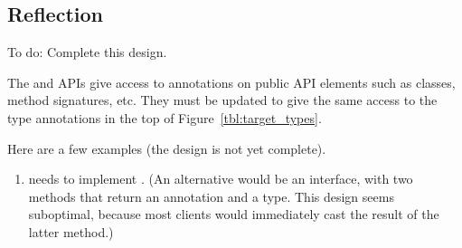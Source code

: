 \documentclass[10pt]{article}
\begin{document}
\subsection{Reflection\label{reflection}}

To do:  Complete this design.

The  and  APIs give access
to annotations on public API elements such as classes,
method signatures, etc.  They must be updated to give the same
access to the type annotations in the top of
Figure~\ref{tbl:target_types}.

Here are a few examples (the design is not yet complete).

\begin{enumerate}
\item
{} needs to implement
.
(An alternative would be an 
interface, with two methods that return an annotation and a type.  This
design seems suboptimal, because most
clients would immediately cast the result of the latter method.)

\end{enumerate}

% 
% 
% 
% 
\end{document}
